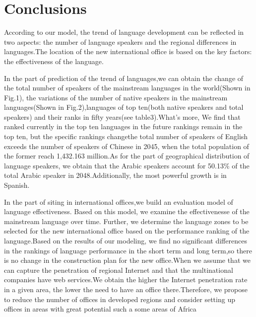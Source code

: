 \section{Conclusions}
According to our model, the trend of language development can be reflected in two aspects: the number of language speakers and the regional differences in languages.The location of the new international office is based on the key factors: the effectiveness of the language.
\par In the part of prediction of the trend of languages,we can obtain the change of the total number of speakers of the mainstream languages in the world(Shown in Fig.1), the variations of the number of native speakers in the mainstream languages(Shown in Fig.2),languages of top ten(both native speakers and total speakers) and their ranks in fifty years(see table3).What's more, We find that ranked currently in the top ten languages in the future rankings remain in the top ten, but the specific rankings changethe total number of speakers of English exceeds the number of speakers of Chinese in 2045, when the total population of the former reach 1,432.163 million.As for the part of geographical distribution of language speakers, we obtain that the Arabic speakers account for 50.13\% of the total Arabic speaker in 2048.Additionally, the most powerful growth is in Spanish.
\par In the part of siting in international offices,we build an evaluation model of language effectiveness. Based on this model, we examine the effectivenesse of the mainstream language over time. Further, we determine the language zones to be selected for the new international office based on the performance ranking of the language.Based on the results of our modeling, we find no significant differences in the rankings of language performance in the short term and long term,so there is no change in the construction plan for the new office.When we assume that we can capture the penetration of regional Internet and that the multinational companies have web services.We obtain the higher the Internet penetration rate in a given area, the lower the need to have an office there.Therefore, we propose to reduce the number of offices in developed regions and consider setting up offices in areas with great potential such a some areas of Africa